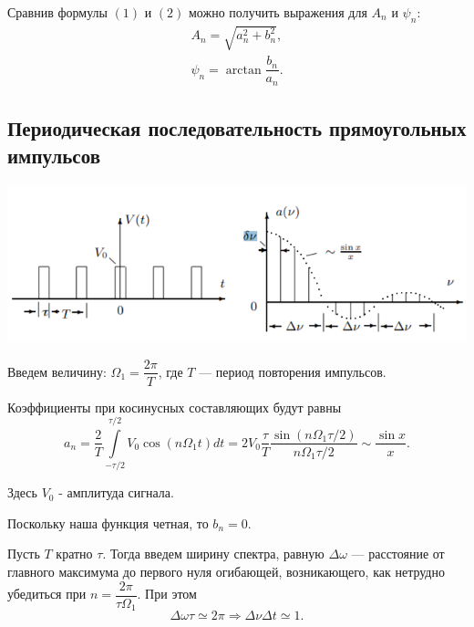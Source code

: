 \documentclass[a4paper,12pt]{article} %
\begin{document}
Сравнив формулы $(1)$ и $(2)$ можно получить выражения для $A_n$  и $\psi_n$:
\begin{equation}
\begin{array}{l}
A_n = \sqrt{a_n^2+b_n^2},\\
 \psi_n = \arctan \dfrac{b_n}{a_n}.
\end{array}
\end{equation}
\subsection{Периодическая последовательность прямоугольных импульсов}
\begin{center}
\includegraphics[scale=0.9]{2.png}
\end{center}
Введем величину: $\Omega_1 = \dfrac{2\pi}{T}$,
где $T$ --- период повторения импульсов.

Коэффициенты при косинусных составляющих будут равны
\begin{equation}
a_n = \dfrac{2}{T}\int\limits_{-\tau/2}^{\tau/2}V_0\cos\left(n\Omega_1 t\right)dt = 2V_0\dfrac{\tau}{T}\dfrac{\sin\left(n\Omega_1\tau/2\right)}{n\Omega_1\tau/2} \sim \dfrac{\sin x}{x}.
\end{equation}

Здесь $V_0$ - амплитуда сигнала.

Поскольку наша функция четная, то $b_n = 0$. 

Пусть $T$ кратно $\tau$. Тогда введем ширину спектра, равную $\Delta \omega$ --- расстояние от главного максимума до первого нуля огибающей, возникающего, как нетрудно убедиться при $n = \dfrac{2\pi}{\tau \Omega_1}$. При 
этом
\begin{equation}
\Delta \omega \tau \simeq 2\pi \Rightarrow \Delta \nu \Delta t \simeq 1.
\end{equation}
\end{document}

